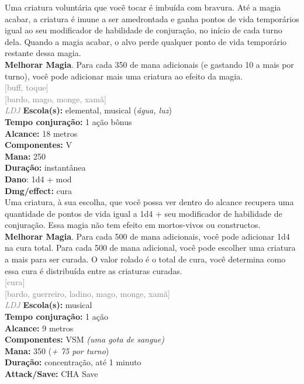 \documentclass{RPG_Adventure}[2021/10/20]
\begin{document}
{\normalsize Uma criatura voluntária que você tocar é imbuída com bravura. Até a magia acabar, a criatura é imune a ser amedrontada e ganha pontos de vida temporários igual ao seu modificador de habilidade de conjuração, no início de cada turno dela. Quando a magia acabar, o alvo perde qualquer ponto de vida temporário restante dessa magia.\\\t \textbf{Melhorar Magia}. Para cada 350 de mana adicionais (e gastando 10 a mais por turno), você pode adicionar mais uma criatura ao efeito da magia.\\}
{\scriptsize \textcolor{gray}{[buff, toque]\\}}
{\scriptsize \textcolor{gray}{[bardo, mago, monge, xamã]\\}}
{\tiny \textcolor{gray}{\textit{LDJ}}}\jump{}
{\small \t \textbf{Escola(s):} elemental, musical (\textit{água, luz})\\\t \textbf{Tempo conjuração:} 1 ação bônus\\\t \textbf{Alcance:} 18 metros\\\t \textbf{Componentes:} V\\\t \textbf{Mana:} 250\\\t \textbf{Duração:} instantânea\\\t \textbf{Dano}: 1d4 + mod\\\t \textbf{Dmg/effect:} cura\\}
{\normalsize Uma criatura, à sua escolha, que você possa ver dentro do alcance recupera uma quantidade de pontos de vida igual a 1d4 + seu modificador de habilidade de conjuração. Essa magia não tem efeito em mortos-vivos ou constructos.\\\t \textbf{Melhorar Magia}. Para cada 500 de mana adicionais, você pode adicionar 1d4 na cura total. Para cada 500 de mana adicional, você pode escolher uma criatura a mais para ser curada. O valor rolado é o total de cura, você determina como essa cura é distribuída entre as criaturas curadas.\\}
{\scriptsize \textcolor{gray}{[cura]\\}}
{\scriptsize \textcolor{gray}{[bardo, guerreiro, ladino, mago, monge, xamã]\\}}
{\tiny \textcolor{gray}{\textit{LDJ}}}\jump{}
{\small \t \textbf{Escola(s):} musical\\\t \textbf{Tempo conjuração:} 1 ação\\\t \textbf{Alcance:} 9 metros\\\t \textbf{Componentes:} VSM \textit{(uma gota de sangue)}\\\t \textbf{Mana:} 350 (\textit{+ 75 por turno})\\\t \textbf{Duração:} concentração, até 1 minuto\\\t \textbf{Attack/Save:} CHA Save\\}
\end{document}
